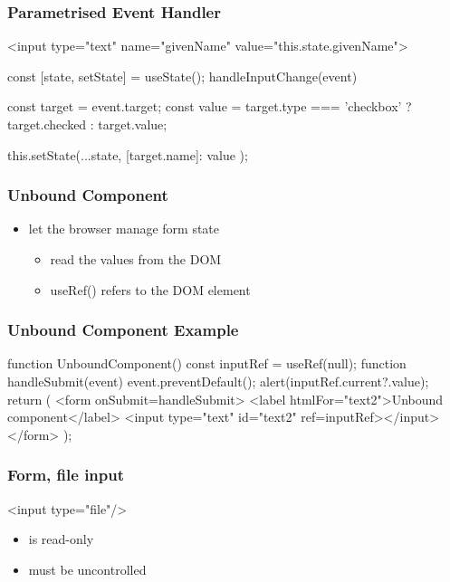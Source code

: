 \begin{frame}[fragile] \frametitle{Parametrised Event Handler}

\begin{CodeBox}{}
<input type="text" name="givenName" 
  value="this.state.givenName">
\end{CodeBox}

\begin{CodeBox}{}
const [state, setState] = useState({});
handleInputChange(event) {
  const target = event.target;
  const value =
    target.type === 'checkbox' ?
        target.checked : target.value;

  this.setState({...state, 
    [target.name]: value
  });
}
\end{CodeBox}
\end{frame}

\begin{frame}[fragile] \frametitle{Unbound Component}
\begin{itemize}
  \item let the browser manage form state
  \begin{itemize}
    \item read the values from the DOM
    \item useRef() refers to the DOM element
  \end{itemize}
\end{itemize}
\end{frame}

\begin{frame}[fragile] \frametitle{Unbound Component Example}
\begin{CodeBox}{}
function UnboundComponent() {
  const inputRef = useRef(null);
  function handleSubmit(event) {
    event.preventDefault();
    alert(inputRef.current?.value);
  }
  return (
    <form onSubmit={handleSubmit}>
      <label htmlFor="text2">Unbound component</label>
      <input type="text" id="text2" ref={inputRef}></input>
    </form>
  );
}
\end{CodeBox}
\end{frame}

\begin{frame}[fragile] \frametitle{Form, file input}
\begin{CodeBox}{}
<input type="file"/>
\end{CodeBox}
\vspace{8mm}

\begin{itemize}
  \item is read-only
  \item must be uncontrolled
\end{itemize}
\end{frame}

